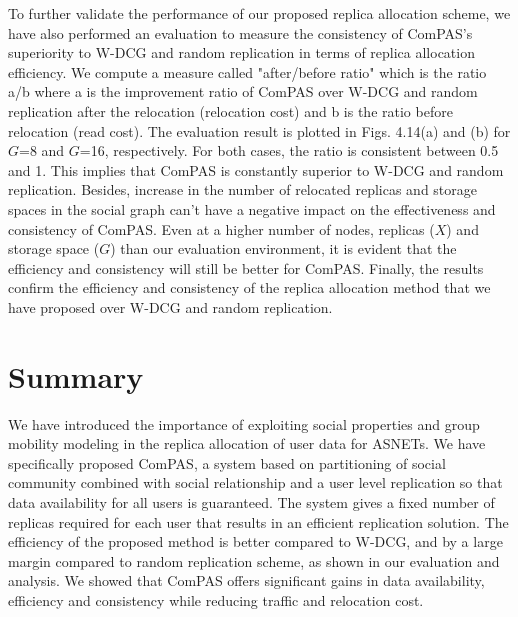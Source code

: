 To further validate the performance of our proposed replica allocation scheme, we have also performed an evaluation to measure the consistency of ComPAS's superiority to W-DCG and random replication in terms of replica allocation efficiency. We compute a measure called "after/before ratio" which is the ratio a/b where a is the improvement ratio of ComPAS over W-DCG and random replication after the relocation (relocation cost) and b is the ratio before relocation (read cost). The evaluation result is plotted in Figs. 4.14(a) and (b) for $G$=8 and $G$=16, respectively. For both cases, the ratio is consistent between 0.5 and 1. This implies that ComPAS is constantly superior to W-DCG and random replication. Besides, increase in the number of relocated replicas and storage spaces in the social graph can't have a negative impact on the effectiveness and consistency of ComPAS. Even at a higher number of nodes, replicas ($X$) and storage space ($G$) than our evaluation environment, it is evident that the efficiency and consistency will still be better for ComPAS. Finally, the results confirm the efficiency and consistency of the replica allocation method that we have proposed over W-DCG and random replication.

\section{Summary}\label{Chap4_06}
We have introduced the importance of exploiting social properties and group mobility modeling in the replica allocation of user data for ASNETs. We have specifically proposed ComPAS, a system based on partitioning of social community combined with social relationship and a user level replication so that data availability for all users is guaranteed. The system gives a fixed number of replicas required for each user that results in an efficient replication solution. The efficiency of the proposed method is better compared to W-DCG, and by a large margin compared to random replication scheme, as shown in our evaluation and analysis. We showed that ComPAS offers significant gains in data availability, efficiency and consistency while reducing traffic and relocation cost.
